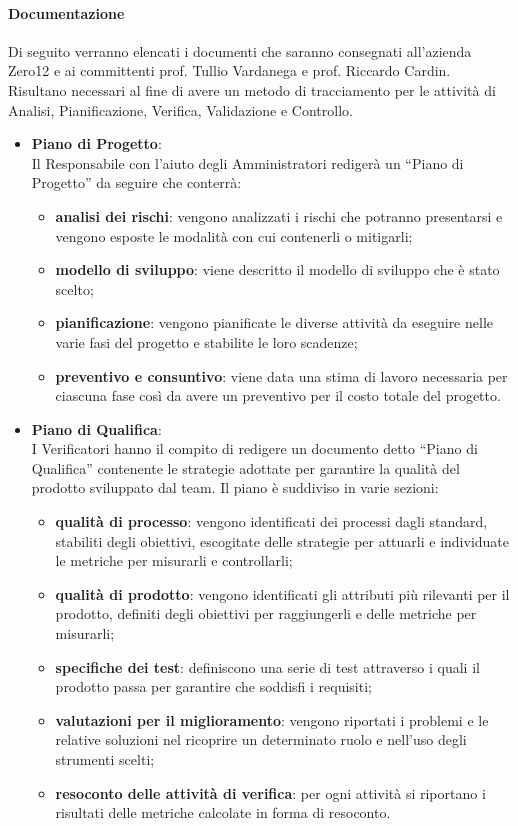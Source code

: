 			\paragraph{Documentazione}
				Di seguito verranno elencati i documenti che saranno consegnati all’azienda Zero12 e ai committenti prof. Tullio Vardanega e prof. Riccardo Cardin. Risultano necessari al fine di avere un metodo di tracciamento per le attività di Analisi, Pianificazione, Verifica, Validazione e Controllo.\\
				\begin{itemize}
					\item\textbf{Piano di Progetto}:\\
						Il Responsabile con l’aiuto degli Amministratori redigerà un “Piano di Progetto” da seguire che conterrà: \\
						\begin{itemize}
							\item\textbf{analisi dei rischi}: vengono analizzati i rischi che potranno presentarsi e vengono esposte le modalità con cui contenerli o mitigarli;
							\item\textbf{modello di sviluppo}: viene descritto il modello di sviluppo che è stato scelto;
							\item\textbf{pianificazione}: vengono pianificate le diverse attività da eseguire nelle varie fasi del progetto e stabilite le loro scadenze;
							\item\textbf{preventivo e consuntivo}: viene data una stima di lavoro necessaria per ciascuna fase così da avere un preventivo per il costo totale del progetto.
						\end{itemize}
					\item\textbf{Piano di Qualifica}:\\
						I Verificatori hanno il compito di redigere un documento detto “Piano di Qualifica” contenente le strategie adottate per garantire la qualità del prodotto sviluppato dal team.
						Il piano è suddiviso in varie sezioni:
						\begin{itemize}
							\item\textbf{qualità di processo}: vengono identificati dei processi dagli standard, stabiliti degli obiettivi, escogitate delle strategie per attuarli e individuate le metriche per misurarli e controllarli;
							\item\textbf{qualità di prodotto}: vengono identificati gli attributi più rilevanti per il prodotto, definiti degli obiettivi per raggiungerli e delle metriche per misurarli;
							\item\textbf{specifiche dei test}: definiscono una serie di test attraverso i quali il prodotto passa per garantire che soddisfi i requisiti;
							\item\textbf{valutazioni per il miglioramento}: vengono riportati i problemi e le relative soluzioni nel ricoprire un determinato ruolo e nell'uso degli strumenti scelti;
							\item\textbf{resoconto delle attività di verifica}: per ogni attività si riportano i risultati delle metriche calcolate in forma di resoconto.
						\end{itemize}
				\end{itemize}
